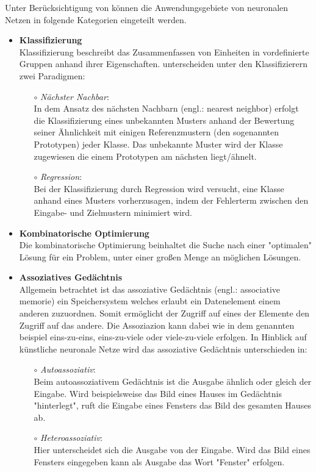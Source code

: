 Unter Berücksichtigung von \citet{Fiesler96} können die Anwendungsgebiete von neuronalen Netzen in folgende Kategorien eingeteilt werden.
\begin{itemize}
\item \textbf{Klassifizierung}\\%
Klassifizierung beschreibt das Zusammenfassen von Einheiten in vordefinierte Gruppen anhand ihrer Eigenschaften.
\citet{Fiesler96} unterscheiden unter den Klassifizierern zwei Paradigmen:
    \begin{itemize}
    \item[$\circ$] \textit{Nächster Nachbar}:\\%
    In dem Ansatz des nächsten Nachbarn (engl.: nearest neighbor) erfolgt die Klassifizierung eines unbekannten Musters anhand der Bewertung seiner Ähnlichkeit mit einigen Referenzmustern (den sogenannten Prototypen) jeder Klasse. Das unbekannte Muster wird der Klasse zugewiesen die einem Prototypen am nächsten liegt/ähnelt.
    
    \item[$\circ$] \textit{Regression}:\\%
    Bei der Klassifizierung durch Regression wird versucht, eine Klasse anhand eines Musters vorherzusagen, indem der Fehlerterm zwischen den Eingabe- und Zielmustern minimiert wird.
    \end{itemize}


\item \textbf{Kombinatorische Optimierung}\\%
Die kombinatorische Optimierung beinhaltet die Suche nach einer "optimalen" Lösung für ein Problem, unter einer großen Menge an möglichen Lösungen. 
 

\item \textbf{Assoziatives Gedächtnis}\\%
Allgemein betrachtet ist das assoziative Gedächtnis (engl.: associative memorie) ein Speichersystem welches erlaubt ein Datenelement einem anderen zuzuordnen. Somit ermöglicht der Zugriff auf eines der Elemente den Zugriff auf das andere.
Die Assoziazion kann dabei wie in dem genannten beispiel eins-zu-eins, eins-zu-viele oder viele-zu-viele erfolgen.
In Hinblick auf künstliche neuronale Netze wird das assoziative Gedächtnis unterschieden in:
    \begin{itemize}
    \item[$\circ$] \textit{Autoassoziativ}:\\%
    Beim autoassoziativem Gedächtnis ist die Ausgabe ähnlich oder gleich der Eingabe. Wird beispielsweise das Bild eines Hauses im Gedächtnis "hinterlegt", ruft die Eingabe eines Fensters das Bild des gesamten Hauses ab.
    
    \item[$\circ$] \textit{Heteroassoziativ}:\\%
    Hier unterscheidet sich die Ausgabe von der Eingabe. Wird das Bild eines Fensters eingegeben kann als Ausgabe das Wort "Fenster" erfolgen.\,
    
    \end{itemize}

\end{itemize}

